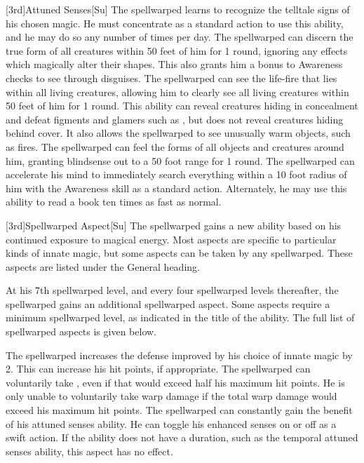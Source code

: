         [3rd]{Attuned Senses}[Su]
        The spellwarped learns to recognize the telltale signs of his chosen magic.
        He must concentrate as a standard action to use this ability, and he may do so any number of times per day.
        The spellwarped can discern the true form of all creatures within 50 feet of him for 1 round, ignoring any effects which magically alter their shapes.
        This also grants him a  bonus to Awareness checks to see through disguises.
        The spellwarped can see the life-fire that lies within all living creatures, allowing him to clearly see all living creatures within 50 feet of him for 1 round.
        This ability can reveal creatures hiding in concealment and defeat figments and glamers such as , but does not reveal creatures hiding behind cover.
        It also allows the spellwarped to see unusually warm objects, such as fires.
        The spellwarped can feel the forms of all objects and creatures around him, granting blindsense out to a 50 foot range for 1 round.
        The spellwarped can accelerate his mind to immediately search everything within a 10 foot radius of him with the Awareness skill as a standard action.
        Alternately, he may use this ability to read a book ten times as fast as normal.

        [3rd]{Spellwarped Aspect}[Su]
        The spellwarped gains a new ability based on his continued exposure to magical energy.
        Most aspects are specific to particular kinds of innate magic, but some aspects can be taken by any spellwarped.
        These aspects are listed under the General heading.

        At his 7th spellwarped level, and every four spellwarped levels thereafter, the spellwarped gains an additional spellwarped aspect.
        Some aspects require a minimum spellwarped level, as indicated in the title of the ability.
        The full list of spellwarped aspects is given below.

        The spellwarped increases the defense improved by his choice of innate magic by 2.
        This can increase his hit points, if appropriate.
        The spellwarped can voluntarily take , even if that would exceed half his maximum hit points.
        He is only unable to voluntarily take warp damage if the total warp damage would exceed his maximum hit points.
        The spellwarped can constantly gain the benefit of his attuned senses ability.
        He can toggle his enhanced senses on or off as a swift action.
        If the ability does not have a duration, such as the temporal attuned senses ability, this aspect has no effect.

